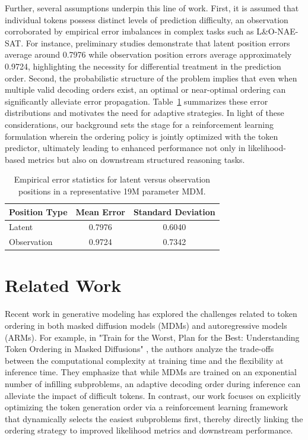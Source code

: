 \documentclass{article} %
\begin{document}
Further, several assumptions underpin this line of work. First, it is assumed that individual tokens possess distinct levels of prediction difficulty, an observation corroborated by empirical error imbalances in complex tasks such as L\&O-NAE-SAT. For instance, preliminary studies demonstrate that latent position errors average around 0.7976 while observation position errors average approximately 0.9724, highlighting the necessity for differential treatment in the prediction order. Second, the probabilistic structure of the problem implies that even when multiple valid decoding orders exist, an optimal or near-optimal ordering can significantly alleviate error propagation. Table~\ref{tab:error} summarizes these error distributions and motivates the need for adaptive strategies. In light of these considerations, our background sets the stage for a reinforcement learning formulation wherein the ordering policy is jointly optimized with the token predictor, ultimately leading to enhanced performance not only in likelihood-based metrics but also on downstream structured reasoning tasks.

\begin{table}[h]
\centering
\begin{tabular}{lcc}
\hline
Position Type  & Mean Error & Standard Deviation \\
\hline
Latent         & 0.7976     & 0.6040 \\
Observation    & 0.9724     & 0.7342 \\
\hline
\end{tabular}
\caption{Empirical error statistics for latent versus observation positions in a representative 19M parameter MDM.}
\label{tab:error}
\end{table}

\section{Related Work}
Recent work in generative modeling has explored the challenges related to token ordering in both masked diffusion models (MDMs) and autoregressive models (ARMs). For example, in "Train for the Worst, Plan for the Best: Understanding Token Ordering in Masked Diffusions" \citep{kim2025train}, the authors analyze the trade-offs between the computational complexity at training time and the flexibility at inference time. They emphasize that while MDMs are trained on an exponential number of infilling subproblems, an adaptive decoding order during inference can alleviate the impact of difficult tokens. In contrast, our work focuses on explicitly optimizing the token generation order via a reinforcement learning framework that dynamically selects the easiest subproblems first, thereby directly linking the ordering strategy to improved likelihood metrics and downstream performance.
\end{document}
